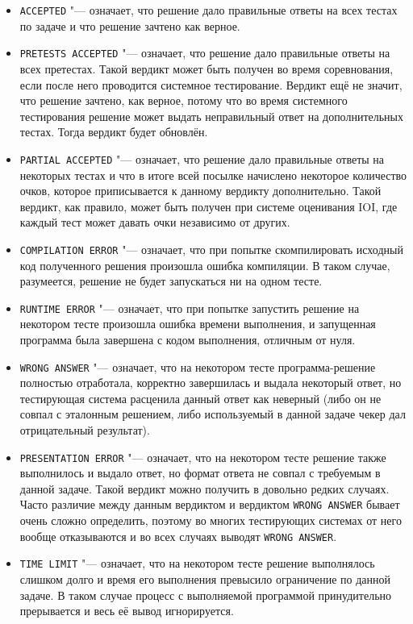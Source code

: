 \begin{itemize}
\item \texttt{ACCEPTED} "--- означает, что решение дало правильные ответы на всех тестах по задаче и что решение зачтено как верное.
\item \texttt{PRETESTS ACCEPTED} "--- означает, что решение дало правильные ответы на всех претестах. Такой вердикт может быть получен во время соревнования, если после него проводится системное тестирование. Вердикт ещё не значит, что решение зачтено, как верное, потому что во время системного тестирования решение может выдать неправильный ответ на дополнительных тестах. Тогда вердикт будет обновлён.
\item \texttt{PARTIAL ACCEPTED} "--- означает, что решение дало правильные ответы на некоторых тестах и что в итоге всей посылке начислено некоторое количество очков, которое приписывается к данному вердикту дополнительно. Такой вердикт, как правило, может быть получен при системе оценивания IOI, где каждый тест может давать очки независимо от других.
\item \texttt{COMPILATION ERROR} "--- означает, что при попытке скомпилировать исходный код полученного решения произошла ошибка компиляции. В таком случае, разумеется, решение не будет запускаться ни на одном тесте.
\item \texttt{RUNTIME ERROR} "--- означает, что при попытке запустить решение на некотором тесте произошла ошибка времени выполнения, и запущенная программа была завершена с кодом выполнения, отличным от нуля.
\item \texttt{WRONG ANSWER} "--- означает, что на некотором тесте программа-решение полностью отработала, корректно завершилась и выдала некоторый ответ, но тестирующая система расценила данный ответ как неверный (либо он не совпал с эталонным решением, либо используемый в данной задаче чекер дал отрицательный результат).
\item \texttt{PRESENTATION ERROR} "--- означает, что на некотором тесте решение также выполнилось и выдало ответ, но формат ответа не совпал с требуемым в данной задаче. Такой вердикт можно получить в довольно редких случаях. Часто различие между данным вердиктом и вердиктом \texttt{WRONG ANSWER} бывает очень сложно определить, поэтому во многих тестирующих системах от него вообще отказываются и во всех случаях выводят \texttt{WRONG ANSWER}.
\item \texttt{TIME LIMIT} "--- означает, что на некотором тесте решение выполнялось слишком долго и время его выполнения превысило ограничение по данной задаче. В таком случае процесс с выполняемой программой принудительно прерывается и весь её вывод игнорируется.

\end{itemize}
